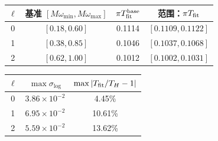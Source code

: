 \documentclass[UTF8,fontset=fandol,11pt,a4paper,oneside]{ctexart}
\numberwithin{equation}{section}
\begin{document}
\noindent\begin{minipage}{\linewidth}
\captionsetup{type=table}\caption{高频有限窗指数拟合与缩窗漂移。}\label{audit:tab:tail-window}
\centering\fontsize{10}{13.5}\selectfont
\setlength{\tabcolsep}{6pt}\renewcommand{\arraystretch}{1.2}
\par{}\par\smallskip
\begin{tabular}{cccc}\toprule
$\ell$ & 基准 $[M\omega_{\min},M\omega_{\max}]$ & $\pi T_{\rm fit}^{\rm base}$ & 范围：$\pi T_{\rm fit}$\\\midrule
0 & $[0.18,0.60]$ & 0.1114 & $[0.1109,0.1122]$\\
1 & $[0.38,0.85]$ & 0.1046 & $[0.1037,0.1068]$\\
2 & $[0.62,1.00]$ & 0.1012 & $[0.1002,0.1031]$\\
\bottomrule\end{tabular}
\par\medskip
\par{}\par\smallskip
\begin{tabular}{ccc}\toprule
$\ell$ & $\max\sigma_{\log}$ & $\max|T_{\rm fit}/T_H-1|$\\\midrule
0 & $3.86\times10^{-2}$ & 4.45\%\\
1 & $6.95\times10^{-2}$ & 10.61\%\\
2 & $5.59\times10^{-2}$ & 13.62\%\\
\bottomrule\end{tabular}
\end{minipage}\par\addvspace{10pt}
\par\addvspace{14pt}
\end{document}
